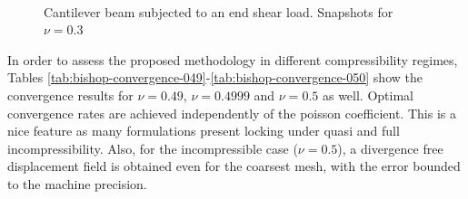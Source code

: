 \documentclass[english,11pt,3p,number,sort&compress]{elsarticle}
\begin{document}
\begin{figure}[H]
    \centering
     \hfill
     \\
     \hfill
    \caption{Cantilever beam subjected to an end shear load. Snapshots for $\nu=0.3$}
    \label{fig:bishop-snapshot}
\end{figure}

In order to assess the proposed methodology in different compressibility regimes, Tables \ref{tab:bishop-convergence-049}-\ref{tab:bishop-convergence-050} show the convergence results for $\nu=0.49$, $\nu=0.4999$ and $\nu=0.5$ as well. Optimal convergence rates are achieved independently of the poisson coefficient. This is a nice feature as many formulations present locking under quasi and full incompressibility. Also, for the incompressible case ($\nu=0.5$), a divergence free displacement field is obtained even for the coarsest mesh, with the error bounded to the machine precision.
\end{document}
